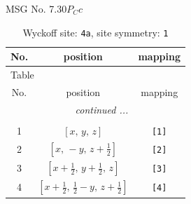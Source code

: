 \documentclass[fleqn,8pt]{jsarticle}
\begin{document}
\setcounter{MaxMatrixCols}{32}

\renewcommand{\tablename}{Table~}
\renewcommand{\figurename}{Figure~}
\begin{center}
\LARGE
MSG No. 7.30\quad$P_{C}c$
\end{center}
\renewcommand{\arraystretch}{1.2}
\begin{longtable}{ccc}
\caption{Wyckoff site: {\tt 4a}, site symmetry: {\tt 1}}
 \\
 \hline \hline
No. & position & mapping \\ \hline \endfirsthead

\multicolumn{2}{l}{\tablename\ \thetable{}} \\
 \hline \hline
No. & position & mapping \\ \hline \endhead

 \hline \hline
\multicolumn{2}{r}{\footnotesize\it continued ...} \\ \endfoot

 \hline \hline
\multicolumn{2}{r}{} \\ \endlastfoot

1 & $\left[ x,\, y,\, z \right]$ & {\tt [1]} \\ \hline
2 & $\left[ x,\, - y,\, z + \frac{1}{2} \right]$ & {\tt [2]} \\ \hline
3 & $\left[ x + \frac{1}{2},\, y + \frac{1}{2},\, z \right]$ & {\tt [3]} \\ \hline
4 & $\left[ x + \frac{1}{2},\, \frac{1}{2} - y,\, z + \frac{1}{2} \right]$ & {\tt [4]} \\
\end{longtable}
\end{document}
